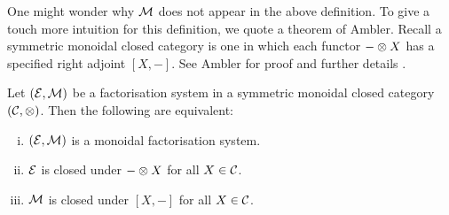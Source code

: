 One might wonder why $\mathcal M$ does not appear in the above definition. To give a
touch more intuition for this definition, we quote a theorem of Ambler. Recall a
symmetric monoidal closed category is one in which each functor $- \otimes X$ has a
specified right adjoint $[X,-]$. See Ambler for proof and further details
\cite[Lemma 5.2.2]{Am}.
\begin{proposition}
  Let $(\mathcal E,\mathcal M)$ be a factorisation system in a symmetric monoidal
  closed category $(\mathcal C,\otimes)$. Then the following are equivalent:
  \begin{enumerate}[(i)]
    \item $(\mathcal E,\mathcal M)$ is a monoidal factorisation system.
    \item $\mathcal E$ is closed under $- \otimes X$ for all $X \in \mathcal C$.
    \item $\mathcal M$ is closed under $[X,-]$ for all $X \in \mathcal C$.
\end{enumerate}
\end{proposition}

